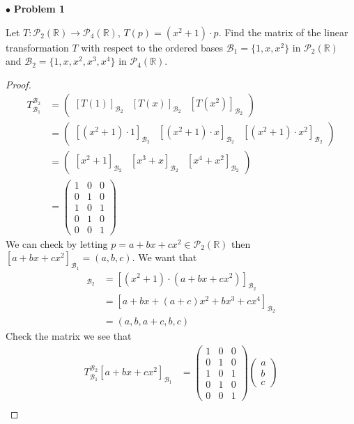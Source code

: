 \documentclass{article}
\begin{document}
$ \bullet$ \textbf{Problem 1}
\medskip

\begin{itshape}
Let $T: \mathcal{P}_2(\mathbb{R}) \to \mathcal{P}_4(\mathbb{R})$, $T(p) = (x^2+1) \cdot p$. Find the matrix of the linear transformation $T$ with respect to the ordered bases $\mathcal{B}_1 = \{ 1, x,x^2 \}$ in $\mathcal{P}_2(\mathbb{R})$ and $\mathcal{B}_2 = \{ 1,x,x^2,x^3,x^4 \} $ in $\mathcal{P}_4(\mathbb{R})$.
\end{itshape}
\medskip

\begin{proof}
$ $\newline
\begin{align*}
T^{\mathcal{B}_2}_{\mathcal{B}_1} &= \begin{pmatrix} [T(1)]_{\mathcal{B}_2} & [T(x)]_{\mathcal{B}_2} & [T(x^2)]_{\mathcal{B}_2}  \end{pmatrix} \\
&= \begin{pmatrix} [(x^2+1) \cdot 1]_{\mathcal{B}_2} & [(x^2+1) \cdot x]_{\mathcal{B}_2} & [(x^2+1) \cdot x^2]_{\mathcal{B}_2}  \end{pmatrix} \\
&= \begin{pmatrix} [x^2+1]_{\mathcal{B}_2} & [x^3+x]_{\mathcal{B}_2} & [x^4+x^2]_{\mathcal{B}_2}  \end{pmatrix} \\
&= \begin{pmatrix} 1 & 0 & 0 \\ 0& 1 & 0 \\ 1 &0&1 \\ 0&1&0 \\ 0& 0& 1 \end{pmatrix}
\end{align*}
We can check by letting $p = a+bx+cx^2 \in \mathcal{P}_2(\mathbb{R})$ then $[ a+bx+cx^2 ]_{\mathcal{B}_1} = (a,b,c)$. We want that 
\begin{align*} 
[T(p)]_{\mathcal{B}_2} &= [(x^2+1) \cdot (a+bx+cx^2) ]_{\mathcal{B}_2} \\
&= [a+bx+(a+c)x^2+bx^3+cx^4]_{\mathcal{B}_2} \\
&= (a, b, a+c, b, c)
\end{align*}
Check the matrix we see that
\begin{align*}
T^{\mathcal{B}_2}_{\mathcal{B}_1} [a+bx+cx^2]_{\mathcal{B}_1} &= \begin{pmatrix} 1 & 0 & 0 \\ 0& 1 & 0 \\ 1 &0&1 \\ 0&1&0 \\ 0& 0& 1 \end{pmatrix} \begin{pmatrix} a \\ b \\ c \end{pmatrix} \\

\end{align*}
\end{proof}
\end{document}
